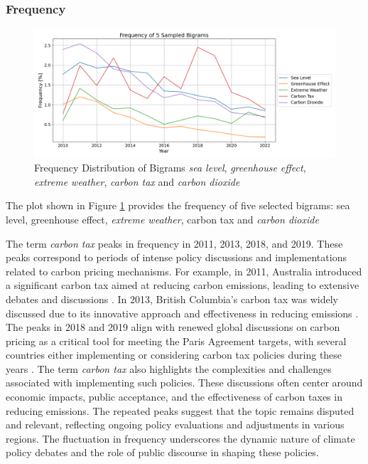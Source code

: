 \subsubsection{Frequency}
\begin{figure}[h]
    \includegraphics[width=\textwidth]{images/topic_details/ngram/frequency_per_topic_5Bigram.png}
    \caption{Frequency Distribution of Bigrams \emph{sea level}, \emph{greenhouse effect}, \emph{extreme weather}, \emph{carbon tax} and \emph{carbon dioxide}}
    \label{fig:frequency_bigrams}
\end{figure}

The plot shown in Figure \ref{fig:frequency_bigrams} provides the frequency of five selected bigrams: sea level, greenhouse effect, \emph{extreme weather}, carbon tax and \emph{carbon dioxide}

The term \emph{carbon tax} peaks in frequency in 2011, 2013, 2018, and 2019. These peaks correspond to periods of intense policy discussions and implementations related to carbon pricing mechanisms. For example, in 2011, Australia introduced a significant carbon tax aimed at reducing carbon emissions, leading to extensive debates and discussions \cite{worldbank2018carbon}. In 2013, British Columbia's carbon tax was widely discussed due to its innovative approach and effectiveness in reducing emissions \cite{murray2015bc}. The peaks in 2018 and 2019 align with renewed global discussions on carbon pricing as a critical tool for meeting the Paris Agreement targets, with several countries either implementing or considering carbon tax policies during these years \cite{worldbank2018carbon}.
The term \emph{carbon tax} also highlights the complexities and challenges associated with implementing such policies. These discussions often center around economic impacts, public acceptance, and the effectiveness of carbon taxes in reducing emissions. The repeated peaks suggest that the topic remains disputed and relevant, reflecting ongoing policy evaluations and adjustments in various regions. The fluctuation in frequency underscores the dynamic nature of climate policy debates and the role of public discourse in shaping these policies.

